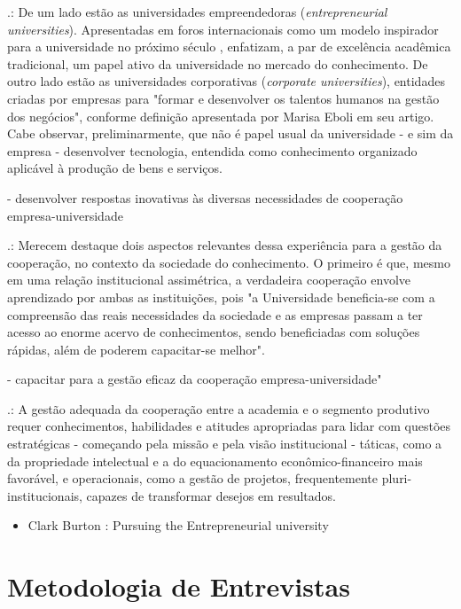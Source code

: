 .: De um lado estão as universidades empreendedoras (\textit{entrepreneurial universities}). Apresentadas em foros internacionais como um modelo inspirador para a universidade no próximo século	, enfatizam, a par de excelência acadêmica tradicional, um papel ativo da universidade no mercado do conhecimento. De outro lado estão as universidades corporativas (\textit{corporate universities}), entidades criadas por empresas para "formar e desenvolver os talentos humanos na gestão dos negócios", conforme definição apresentada por Marisa Eboli em seu artigo.  Cabe observar, preliminarmente, que não é papel usual da universidade - e sim da empresa - desenvolver tecnologia, entendida como conhecimento organizado aplicável à produção de bens e serviços.

- desenvolver respostas inovativas às diversas necessidades de cooperação empresa-universidade

.: Merecem destaque dois aspectos relevantes dessa experiência para a gestão da cooperação, no contexto da sociedade do conhecimento. O primeiro é que, mesmo em uma relação institucional assimétrica, a verdadeira cooperação envolve aprendizado por ambas as instituições, pois "a Universidade beneficia-se com a compreensão das reais necessidades da sociedade e as empresas passam a ter acesso ao enorme acervo de conhecimentos, sendo beneficiadas com soluções rápidas, além de poderem capacitar-se melhor". 

- capacitar para a gestão eficaz da cooperação empresa-universidade"

.: A gestão adequada da cooperação entre a academia e o segmento produtivo requer conhecimentos, habilidades e atitudes apropriadas para lidar com questões estratégicas - começando pela missão e pela visão institucional - táticas, como a da propriedade intelectual e a do equacionamento econômico-financeiro mais favorável, e operacionais, como a gestão de projetos, frequentemente pluri-institucionais, capazes de transformar desejos em resultados. 

\begin{itemize}
\item Clark Burton : Pursuing the Entrepreneurial university
\end{itemize}

\section{Metodologia de Entrevistas}
\label{cha:ensino}
